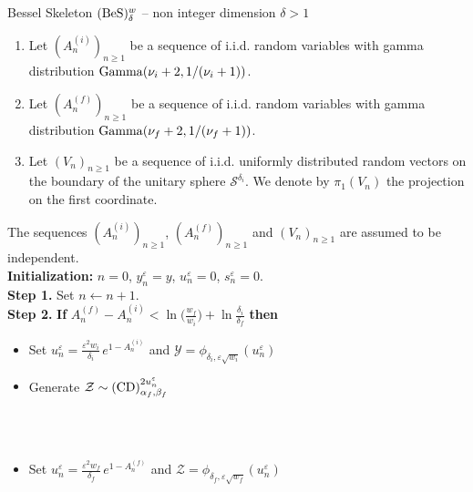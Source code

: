 \documentclass[12pt]{article}
\newcommand{\ai}{A^{(i)}}
\newcommand{\af}{A^{(f)}}
\numberwithin{equation}{section}
\begin{document}
\begin{framed}
\centerline{\sc Bessel Skeleton $({\rm BeS})_\delta^w$ -- non integer dimension $\delta>1$}

\vspace*{0.2cm}
\begin{enumerate}
\item Let $(\ai_n)_{n\ge 1}$  be a sequence of i.i.d. random variables with gamma distribution ${\rm Gamma}(\nu_i+2,1/(\nu_i+1))$.
\item Let $(\af_n)_{n\ge 1}$  be a sequence of i.i.d. random variables with gamma distribution ${\rm Gamma}(\nu_f+2,1/(\nu_f+1))$.
\item Let $(V_n)_{n\ge 1}$ be a sequence of i.i.d. uniformly distributed random vectors on the boundary of the unitary sphere $\mathcal{S}^{\delta_i}$. We denote by $\pi_1(V_n)$ the projection on
the first coordinate. 
\end{enumerate}
The sequences 
 $(\ai_n)_{n\ge 1}$, $(\af_n)_{n\ge 1}$ and $(V_n)_{n\ge 1}$ are assumed to be independent. \\[5pt]
{\bf Initialization:} $n=0$, $y^\varepsilon_n=y$, $u_n^\varepsilon=0$, $s_n^\varepsilon=0$.\\[5pt]
{\bf Step 1.} Set $n\leftarrow n+1$.\\[5pt]
{\bf Step 2.} {\bf If} $\af_n-\ai_n<\ln\Big(\frac{w_f}{w_i}\Big)+\ln\frac{\delta_i}{\delta_f}$ {\bf then}\\[5pt]
\hspace*{2cm}\begin{minipage}{12cm}\begin{itemize}
\item Set $u_n^\varepsilon=\frac{\varepsilon^2w_i}{\delta_i}\,e^{1-\ai_n}$ and $\mathcal{Y}=\phi_{\delta_i,\varepsilon\sqrt{w_i}}(u_n^\varepsilon)$ 
\item Generate $\mathcal{Z}\sim ({\rm CD})^{2u_n^\varepsilon}_{\alpha_f,\beta_f}$ 
\end{itemize}\end{minipage}\\[5pt]
\hspace*{1.7cm}{\bf else} \\[5pt]
\hspace*{2cm}\begin{minipage}{12cm}\begin{itemize}
\item Set $u_n^\varepsilon=\frac{\varepsilon^2w_f}{\delta_f}\,e^{1-\af_n}$ and $\mathcal{Z}=\phi_{\delta_f,\varepsilon\sqrt{w_f}}(u_n^\varepsilon)$

\end{itemize}
\end{minipage}
\end{framed}
\end{document}

